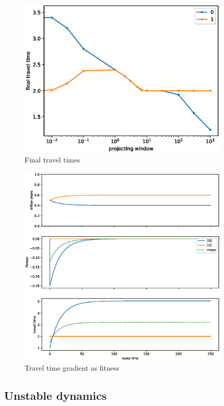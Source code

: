 \documentclass[12pt]{article}
\begin{document}
\begin{figure}
	\includegraphics[width=0.9\textwidth]{img/final_tt_proj.eps}
	\caption{ Final travel times }
	\label{fig:final_tt_proj}

\end{figure}

\begin{figure}
	\includegraphics[width=0.9\textwidth]{img/replicator_grad_tt.eps}
	\caption{ Travel time gradient as fitness }
	\label{fig:replicator_grad_tt}

\end{figure}


\subsection*{Unstable dynamics}
\end{document}
